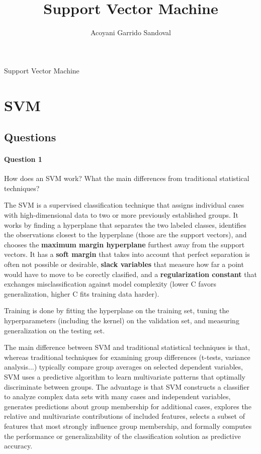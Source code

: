 \documentclass[journal]{IEEEtran}
\begin{document}
\title{Support Vector Machine}

\author{Acoyani Garrido Sandoval}

\maketitle

\begin{IEEEkeywords}
Support Vector Machine
\end{IEEEkeywords}

\section{SVM}




\subsection{Questions}


\paragraph{Question 1} How does an SVM work? What the main differences from traditional statistical techniques?

The SVM is a supervised classification technique that assigns individual cases with high-dimensional data to two or more previously established groups. It works by finding a hyperplane that separates the two labeled classes, identifies the observations closest to the hyperplane (those are the support vectors), and chooses the \textbf{maximum margin hyperplane} furthest away from the support vectors. It has a \textbf{soft margin} that takes into account that perfect separation is often not possible or desirable, \textbf{slack variables} that measure how far a point would have to move to be corectly clasified, and a \textbf{regularization constant} that exchanges misclassification against model complexity (lower C favors generalization, higher C fits training data harder).

Training is done by fitting the hyperplane on the training set, tuning the hyperparameters (including the kernel) on the validation set, and measuring generalization on the testing set.

The main difference between SVM and traditional statistical techniques is that, whereas traditional techniques for examining group differences (t-tests, variance analysis...) typically compare group averages on selected dependent variables, SVM uses a predictive algorithm to learn multivariate patterns that optimally discriminate between groups. The advantage is that SVM constructs a classifier to analyze complex data sets with many cases and independent variables, generates predictions about group membership for additional cases, explores the relative and multivariate contributions of included features, selects a subset of features that most strongly influence group membership, and formally computes the performance or generalizability of the classification solution as predictive accuracy.
\end{document}
